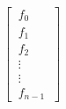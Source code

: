 \documentclass[preview]{standalone}
\begin{document}
\begin{align*}
\left[\begin{array}{l}\
            f_{0} \\\
            f_{1} \\\
            f_{2} \\\
            \vdots \\\
            \vdots \\\
            f_{n-1}\
            \end{array}\right]
\end{align*}
\end{document}
